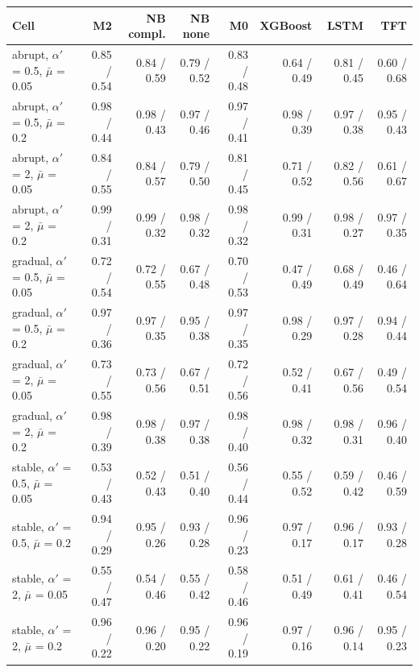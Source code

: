 \documentclass[10pt,a4paper]{article}
\begin{document}
\vspace{6pt}
\noindent\begin{minipage}{\linewidth}
\centering\scriptsize
\begin{tabular}{lrrrrrrr}
\toprule
Cell & M2 & NB compl. & NB none & M0 & XGBoost & LSTM & TFT \\ \midrule
abrupt, $\alpha'$ = 0.5, $\bar{\mu}$ = 0.05 & 0.85 / 0.54 & 0.84 / 0.59 & 0.79 / 0.52 & 0.83 / 0.48 & 0.64 / 0.49 & 0.81 / 0.45 & 0.60 / 0.68 \\
abrupt, $\alpha'$ = 0.5, $\bar{\mu}$ = 0.2 & 0.98 / 0.44 & 0.98 / 0.43 & 0.97 / 0.46 & 0.97 / 0.41 & 0.98 / 0.39 & 0.97 / 0.38 & 0.95 / 0.43 \\
abrupt, $\alpha'$ = 2, $\bar{\mu}$ = 0.05 & 0.84 / 0.55 & 0.84 / 0.57 & 0.79 / 0.50 & 0.81 / 0.45 & 0.71 / 0.52 & 0.82 / 0.56 & 0.61 / 0.67 \\
abrupt, $\alpha'$ = 2, $\bar{\mu}$ = 0.2 & 0.99 / 0.31 & 0.99 / 0.32 & 0.98 / 0.32 & 0.98 / 0.32 & 0.99 / 0.31 & 0.98 / 0.27 & 0.97 / 0.35 \\
gradual, $\alpha'$ = 0.5, $\bar{\mu}$ = 0.05 & 0.72 / 0.54 & 0.72 / 0.55 & 0.67 / 0.48 & 0.70 / 0.53 & 0.47 / 0.49 & 0.68 / 0.49 & 0.46 / 0.64 \\
gradual, $\alpha'$ = 0.5, $\bar{\mu}$ = 0.2 & 0.97 / 0.36 & 0.97 / 0.35 & 0.95 / 0.38 & 0.97 / 0.35 & 0.98 / 0.29 & 0.97 / 0.28 & 0.94 / 0.44 \\
gradual, $\alpha'$ = 2, $\bar{\mu}$ = 0.05 & 0.73 / 0.55 & 0.73 / 0.56 & 0.67 / 0.51 & 0.72 / 0.56 & 0.52 / 0.41 & 0.67 / 0.56 & 0.49 / 0.54 \\
gradual, $\alpha'$ = 2, $\bar{\mu}$ = 0.2 & 0.98 / 0.39 & 0.98 / 0.38 & 0.97 / 0.38 & 0.98 / 0.40 & 0.98 / 0.32 & 0.98 / 0.31 & 0.96 / 0.40 \\
stable, $\alpha'$ = 0.5, $\bar{\mu}$ = 0.05 & 0.53 / 0.43 & 0.52 / 0.43 & 0.51 / 0.40 & 0.56 / 0.44 & 0.55 / 0.52 & 0.59 / 0.42 & 0.46 / 0.59 \\
stable, $\alpha'$ = 0.5, $\bar{\mu}$ = 0.2 & 0.94 / 0.29 & 0.95 / 0.26 & 0.93 / 0.28 & 0.96 / 0.23 & 0.97 / 0.17 & 0.96 / 0.17 & 0.93 / 0.28 \\
stable, $\alpha'$ = 2, $\bar{\mu}$ = 0.05 & 0.55 / 0.47 & 0.54 / 0.46 & 0.55 / 0.42 & 0.58 / 0.46 & 0.51 / 0.49 & 0.61 / 0.41 & 0.46 / 0.54 \\
stable, $\alpha'$ = 2, $\bar{\mu}$ = 0.2 & 0.96 / 0.22 & 0.96 / 0.20 & 0.95 / 0.22 & 0.96 / 0.19 & 0.97 / 0.16 & 0.96 / 0.14 & 0.95 / 0.23 \\
\bottomrule
\end{tabular}
\end{minipage}
\vspace{8pt}
\end{document}

